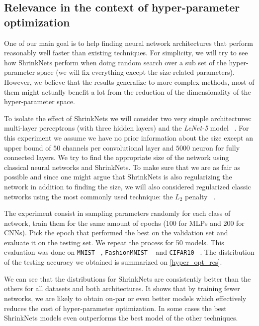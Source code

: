\documentclass[sigconf]{acmart}
\begin{document}
\subsection{Relevance in the context of hyper-parameter optimization}

One of our main goal is to help finding neural network architectures that
perform reasonably well faster than existing techniques. For simplicity, we
will try to see how ShrinkNets perform when doing random search over a sub set
of the hyper-parameter space (we will fix everything except the size-related
parameters). However, we believe that the results generalize to more complex
methods, most of them might actually benefit a lot from the reduction of the
dimensionality of the hyper-parameter space.

\par To isolate the effect of ShrinkNets we will consider two very simple
architectures: multi-layer perceptrons (with three hidden layers) and the
\textit{LeNet-5} model ~\cite{Lecun1998}. For this experiment we assume we have no prior
information about the size except an upper bound of $50$ channels per
convolutional layer and $5000$ neuron for fully connected layers.  We try to
find the appropriate size of the network using classical neural networks and
ShrinkNets. To make sure that we are as fair as possible and since one might
argue that ShrinkNets is also regularizing the network in addition to finding
the size, we will also considered regularized classic networks using the most
commonly used technique: the $L_2$ penalty ~\cite{Ng2004}.
\par The experiment consist in sampling parameters randomly for each class of
network, train them for the same amount of epochs (100 for MLPs and 200 for CNNs). Pick the epoch that performed the best on the validation set and evaluate it
on the testing set. We repeat the process for 50 models. This evaluation was done
on \texttt{MNIST} ~\cite{Lecun1998}, \texttt{FashionMNIST} ~\cite{Xiao2017} and \texttt{CIFAR10} ~\cite{Krizhevsky2009}. The distribution of the testing accuracy we obtained is summarized on \autoref{hyper_opt_res}.

We can see that the distributions for ShrinkNets are consistently better than the
others for all datasets and both architectures. It shows that by training fewer
networks, we are likely to obtain on-par or even better models which effectively
reduces the cost of hyper-parameter optimization. In some cases the best ShrinkNets
models even outperforms the best model of the other techniques.
\end{document}
